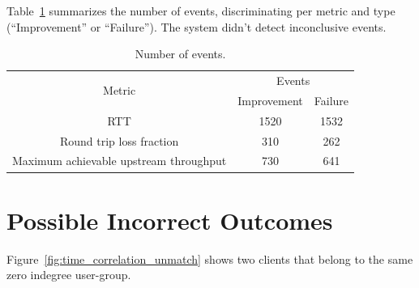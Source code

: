 Table~\ref{table:number_of_events} summarizes the number of events,
discriminating per metric and type (``Improvement'' or ``Failure'').
The system didn't detect inconclusive events.

\begin{table}[H]
\centering
\begin{tabular}{|c|c|l|l|c|l|l|}
\hline
\multirow{3}{*}{Metric}                & \multicolumn{6}{c|}{Events}                                                                       \\ \cline{2-7}
                                       & \multicolumn{3}{c|}{\multirow{2}{*}{Improvement}} & \multicolumn{3}{c|}{\multirow{2}{*}{Failure}} \\
                                       & \multicolumn{3}{c|}{}                             & \multicolumn{3}{c|}{}                         \\ \hline
RTT                                    & \multicolumn{3}{c|}{1520}                         & \multicolumn{3}{c|}{1532}                     \\ \hline
Round trip loss fraction               & \multicolumn{3}{c|}{310}                          & \multicolumn{3}{c|}{262}                      \\ \hline
Maximum achievable upstream throughput & \multicolumn{3}{c|}{730}                          & \multicolumn{3}{c|}{641}                      \\ \hline
\end{tabular}
\caption{Number of events.}
\label{table:number_of_events}
\end{table}

\section{Possible Incorrect Outcomes}
\label{sec:possible_wrong_outcomes}

Figure~\ref{fig:time_correlation_unmatch} shows two clients that belong to
the same zero indegree user-group.

